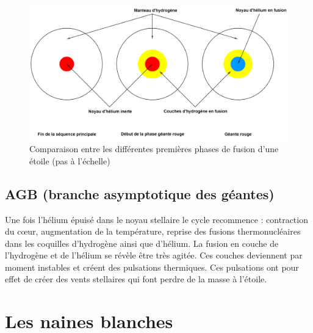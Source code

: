 \begin{figure}[H]\vspace{1cm}
	\centering
	\includegraphics[scale=0.40]{images/compo_sp_gr}
	\caption[Comparaison entre les différentes premières phases de fusion d'une étoile (pas à l'échelle) - figure réalisée avec GeoGebra]{Comparaison entre les différentes premières phases de fusion d'une étoile (pas à l'échelle)}
	\label{Fig. 2.4}
\end{figure}

\subsection{AGB (branche asymptotique des géantes)}\label{2.2.2}

Une fois l’hélium épuisé dans le noyau stellaire le cycle recommence : contraction du cœur, augmentation de la température, reprise des fusions thermonucléaires dans les coquilles d’hydrogène ainsi que d’hélium. La fusion en couche de l’hydrogène et de l’hélium se révèle être très agitée. Ces couches deviennent par moment instables et créent des pulsations thermiques. Ces pulsations ont pour effet de créer des vents stellaires qui font perdre de la masse à l’étoile.

\section{Les naines blanches}\label{2.3}

